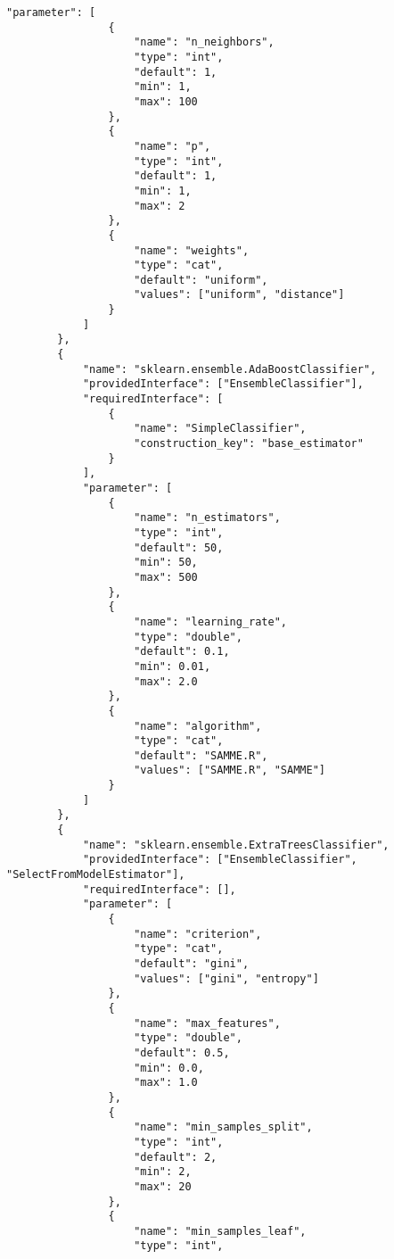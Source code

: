 \begin{Verbatim}[fontsize=\scriptsize]
            "parameter": [
                {
                    "name": "n_neighbors",
                    "type": "int",
                    "default": 1,
                    "min": 1,
                    "max": 100
                },
                {
                    "name": "p",
                    "type": "int",
                    "default": 1,
                    "min": 1,
                    "max": 2
                },
                {
                    "name": "weights",
                    "type": "cat",
                    "default": "uniform",
                    "values": ["uniform", "distance"]
                }
            ]
        },
        {
            "name": "sklearn.ensemble.AdaBoostClassifier",
            "providedInterface": ["EnsembleClassifier"],
            "requiredInterface": [
                {
                    "name": "SimpleClassifier",
                    "construction_key": "base_estimator"
                }
            ],
            "parameter": [
                {
                    "name": "n_estimators",
                    "type": "int",
                    "default": 50,
                    "min": 50,
                    "max": 500
                },
                {
                    "name": "learning_rate",
                    "type": "double",
                    "default": 0.1,
                    "min": 0.01,
                    "max": 2.0
                },
                {
                    "name": "algorithm",
                    "type": "cat",
                    "default": "SAMME.R",
                    "values": ["SAMME.R", "SAMME"]
                }
            ]
        },
        {
            "name": "sklearn.ensemble.ExtraTreesClassifier",
            "providedInterface": ["EnsembleClassifier", "SelectFromModelEstimator"],
            "requiredInterface": [],
            "parameter": [
                {
                    "name": "criterion",
                    "type": "cat",
                    "default": "gini",
                    "values": ["gini", "entropy"]
                },
                {
                    "name": "max_features",
                    "type": "double",
                    "default": 0.5,
                    "min": 0.0,
                    "max": 1.0
                },
                {
                    "name": "min_samples_split",
                    "type": "int",
                    "default": 2,
                    "min": 2,
                    "max": 20
                },
                {
                    "name": "min_samples_leaf",
                    "type": "int",

\end{Verbatim}
